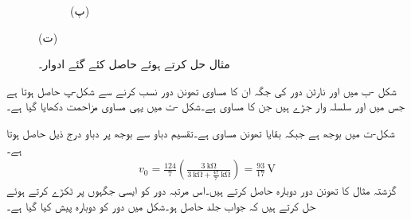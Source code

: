 \begin{figure}
\begin{subfigure}{0.5\textwidth}
\caption*{(پ)}
\end{subfigure}%
\begin{subfigure}{0.5\textwidth}
\centering
{}
\end{subfigure}%
\caption*{(ت)}
\caption{مثال  حل کرتے ہوئے حاصل کئے گئے ادوار۔}
\label{شکل_مثال_تھونن_سے_نارٹن_پ}
\end{figure}

شکل -ب میں  اور  نارٹن دور  کی جگہ ان کا مساوی تھونن دور  نسب کرنے سے شکل-پ حاصل ہوتا ہے جس میں  اور  سلسلہ وار جڑے ہیں جن کا مساوی  ہے۔شکل -ت میں یہی مساوی مزاحمت دکھایا گیا ہے۔

شکل-ت میں  بوجھ ہے جبکہ بقایا تھونن مساوی ہے۔تقسیم دباو سے بوجھ پر دباو درج ذیل حاصل ہوتا ہے۔
\begin{align*}
v_0=\frac{124}{7}\left(\frac{\SI{3}{\kilo\ohm}}{\SI{3}{\kilo\ohm}+\frac{47}{7}\,\si{\kilo\ohm}} \right)=\frac{93}{17} \, \si{\volt}
\end{align*}
گزشتہ مثال کا تھونن دور دوبارہ حاصل کرتے ہیں۔اس مرتبہ دور کو ایسی جگہوں پر ٹکڑے کرتے ہوئے حل کرتے ہیں کہ جواب جلد حاصل ہو۔شکل  میں دور کو دوبارہ پیش کیا گیا ہے۔

